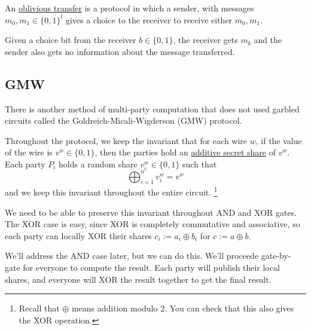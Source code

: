 \begin{definition}
    An \ul{oblivious transfer} is a protocol in which a sender, with messages $m_0, m_1\in\{0, 1\}^l$ gives a choice to the receiver to receive either $m_0, m_1$.

    Given a choice bit from the receiver $b\in\{0,1\}$, the receiver gets $m_b$ and the sender also gets no information about the message transferred.


\end{definition}

\subsection{GMW}

There is another method of multi-party computation that does not used garbled circuits called the Goldreich-Micali-Wigderson (GMW) protocol.

Throughout the protocol, we keep the invariant that for each wire $w$, if the value of the wire is $v^w \in\{0, 1\}$, then the parties hold an \ul{additive secret share} of $v^w$. Each party $P_i$ holds a random share $v_i^w\in\{0,1\}$ such that
\[\bigoplus_{i=1}^n v_i^w = v^w\]
and we keep this invariant throughout the entire circuit. \footnote{Recall that $\oplus$ means addition modulo 2. You can check that this also gives the XOR operation.}

We need to be able to preserve this invariant throughout \textsf{AND} and \textsf{XOR} gates. The \textsf{XOR} case is easy, since \textsf{XOR} is completely commutative and associative, so each party can locally \textsf{XOR} their shares $c_i := a_i\oplus b_i$ for $c := a\oplus b$.

We'll address the \textsf{AND} case later, but we can do this. We'll proceede gate-by-gate for everyone to compute the result. Each party will publish their local shares, and everyone will \textsf{XOR} the result together to get the final result.

